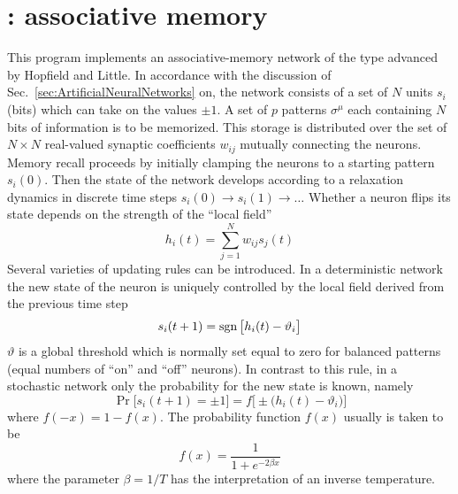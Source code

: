 \section[ASSO: associative memory]{: associative memory}
This program implements an associative-memory network of the type advanced by Hopfield and Little. In accordance with the discussion of Sec.~\ref{sec:ArtificialNeuralNetworks} on, the network consists of a set of $N$ units $s_i$ (bits) which can take on the values $\pm1$. A set of $p$ patterns $\sigma^\mu$ each containing $N$ bits of information is to be memorized. This storage is distributed over the set of $N\times N$ real-valued synaptic coefficients $w_{ij}$ mutually connecting the neurons. Memory recall proceeds by initially clamping the neurons to a starting pattern $s_i(0)$. Then the state of the network develops according to a relaxation dynamics in discrete time steps $s_i(0)\rightarrow s_i(1)\rightarrow\ldots$ Whether a neuron flips its state depends on the strength of the ``local field''
\begin{equation}\label{ASSOfield}
h_i(t)=\sum_{j=1}^Nw_{ij}s_j(t)
\end{equation}
Several varieties of updating rules can be introduced. In a deterministic network the new state of the neuron is uniquely controlled by the local field derived from the previous time step
\begin{equation}\label{ASSOdeterministic}
s_i(t+1)=\operatorname{sgn}{\bigl[h_i(t)-\vartheta_i\bigr]}
\end{equation}
$\vartheta$ is a global threshold which is normally set equal to zero for balanced patterns (equal numbers of ``on'' and ``off'' neurons). In contrast to this rule, in a stochastic network only the probability for the new state is known, namely
\begin{equation}\label{ASSOstochastic}
\operatorname{Pr}\bigl[s_i(t+1)=\pm1\bigr]=f\bigl[\pm\bigl(h_i(t)-\vartheta_i\bigr)\bigr]
\end{equation}
where $f(-x)=1-f(x)$. The probability function $f(x)$ usually is taken to be
\begin{equation}
f(x)=\frac{1}{1+e^{-2\beta x}}
\end{equation}
where the parameter $\beta=1/T$ has the interpretation of an inverse temperature.

